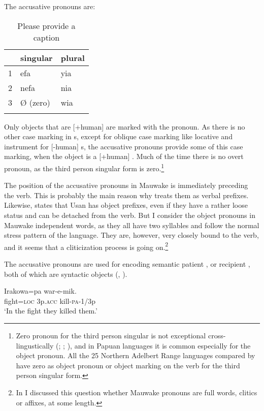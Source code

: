 The accusative pronouns are:

\begin{table}
\caption{Please provide a caption}
\label{} 
\begin{tabular}{lll}
\mytoprule
 &singular &plural\\
\midrule
1 &efa &yia\\
2 &nefa &nia\\
3 &{\O} (zero) &wia\\
\mybottomrule
\end{tabular}
\end{table}


Only objects that are [+human] are marked with the pronoun. As there is no other case marking in s, except for oblique case marking like locative and instrument for [\nobreakdash-human] s, the accusative pronouns provide some of this case marking, when the object is a [+human] . Much of the time there is no overt pronoun, as the third person singular form is zero.\footnote{Zero pronoun for the third person singular is not exceptional cross-lingustically (\citealt[278]{Lyons1968}; \citealt[66]{Foley1986}; \citealt[166]{Givon1976}), and in Papuan languages it is common especially for the object pronoun. All the 25 Northern Adelbert Range languages compared by \citet[9,160]{ZGraggen1980} have zero as object pronoun or object marking on the verb for the third person singular form.} 

The position of the accusative pronouns in Mauwake is immediately preceding the verb. This is probably the main reason why \citet{ZGraggen1971} treats them as verbal prefixes. Likewise, \citet[108]{Reesink1987} states that Usan has object prefixes, even if they have a rather loose status and can be detached from the verb. But I consider the object pronouns in Mauwake independent words, as they all have two syllables and follow the normal stress pattern of the language. They are, however, very closely bound to the verb, and it seems that a cliticization process is going on.\footnote{In \citet{Jarvinen1991} I discussed this question whether Mauwake pronouns are full words, clitics or affixes, at some length.} 

The accusative pronouns are used for encoding semantic patient , or recipient , both of which are syntactic objects (, ). 

\ea%
\label{ex:3:x548}
\gll Irakowa=pa  war-e-mik. \\
fight=\textsc{loc} 3p.\textsc{acc} kill-\textsc{pa}-1/3p\\
\glt`In the fight they killed them.'
\z

